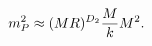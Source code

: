 \begin{equation}
    \label{mplanck}
    m_P^2\approx %
    (M R)^{D_2}
    {M\over  k} M^2 .
\end{equation}

